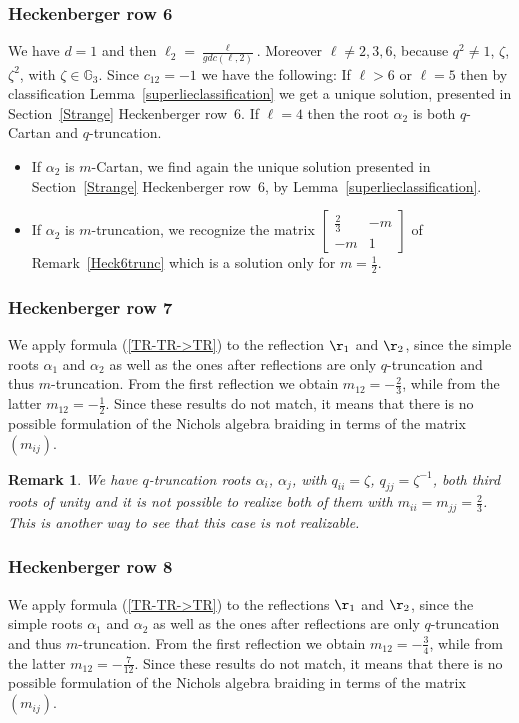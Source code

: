 \documentclass[pdftex]{sigma}%
\numberwithin{equation}{section}
\newtheorem{oss}[teo]{Remark} }
\begin{document}
\subsubsection*{Heckenberger row 6}
We have $d=1$ and then $\ell_2 = \frac{\ell}{gdc(\ell,2)}$. Moreover $\ell \neq 2, 3, 6$, because $q^2 \neq 1$, $\zeta$, $\zeta^2$, with $\zeta \in \mathbb{G}_3$. Since $c_{12}=-1$ we have the following: If $\ell > 6$ or $\ell = 5$ then by classification Lemma~\ref{superlieclassification} we get a unique solution, presented in Section~\ref{Strange} Heckenberger row~6. If $\ell = 4$ then the root $\alpha_2$ is both $q$-Cartan and $q$-truncation.
\begin{itemize}\itemsep=0pt
	\item If $\alpha_2$ is $m$-Cartan, we find again the unique solution presented in Section~\ref{Strange} Heckenberger row~6, by Lemma~\ref{superlieclassification}.
	\item If $\alpha_2$ is $m$-truncation, we recognize the matrix $\left[\begin{smallmatrix}
 \frac{2}{3} & -m\\
 -m & 1
\end{smallmatrix}\right] $
of Remark~\ref{Heck6trunc} which is a solution only for $m=\frac{1}{2}$.
\end{itemize}

\subsubsection*{Heckenberger row 7}
We apply formula (\ref{TR-TR->TR}) to the reflection $\r_1$ and $\r_2$, since the simple roots $\alpha_1$ and $\alpha_2$ as well as the ones after reflections are only $q$-truncation and thus $m$-truncation. From the first reflection we obtain $m_{12}=-\frac{2}{3}$, while from the latter $m_{12}=-\frac{1}{2}$. Since these results do not match, it means that there is no possible formulation of the Nichols algebra braiding in terms of the matrix~$(m_{ij})$.
\begin{oss} We have $q$-truncation roots $\alpha_i$, $\alpha_j$, with $q_{ii}= \zeta$, $q_{jj}=\zeta^{-1}$, both third roots of unity and it is not possible to realize both of them with $m_{ii}=m_{jj}=\frac{2}{3}$. This is another way to see that this case is not realizable.
\end{oss}

\subsubsection*{Heckenberger row 8}
We apply formula (\ref{TR-TR->TR}) to the reflections $\r_1$ and $\r_2$, since the simple roots $\alpha_1$ and $\alpha_2$ as well as the ones after reflections are only $q$-truncation and thus $m$-truncation. From the first reflection we obtain $m_{12}=-\frac{3}{4}$, while from the latter $m_{12}=-\frac{7}{12}$. Since these results do not match, it means that there is no possible formulation of the Nichols algebra braiding in terms of the matrix~$(m_{ij})$.
\end{document}
